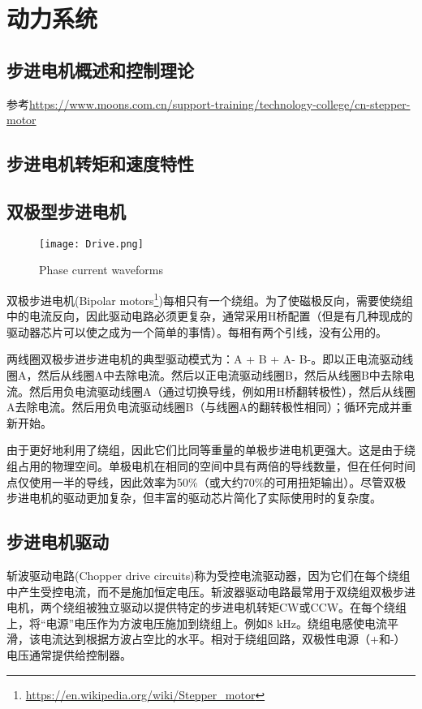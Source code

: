 \chapter{动力系统}
\label{cha:Motor}

\section{步进电机概述和控制理论}


参考\url{https://www.moons.com.cn/support-training/technology-college/cn-stepper-motor}

\section{步进电机转矩和速度特性}


\section{双极型步进电机}

\begin{figure}[htbp]
    \centering
    \texttt{[image: Drive.png]}
    \caption{Phase current waveforms}
    \label{fig:Phase-current}
\end{figure}

双极步进电机(Bipolar motors\footnote{\url{https://en.wikipedia.org/wiki/Stepper\_motor}})每相只有一个绕组。为了使磁极反向，需要使绕组中的电流反向，因此驱动电路必须更复杂，通常采用H桥配置（但是有几种现成的驱动器芯片可以使之成为一个简单的事情）。每相有两个引线，没有公用的。

两线圈双极步进步进电机的典型驱动模式为：A + B + A- B-。即以正电流驱动线圈A，然后从线圈A中去除电流。然后以正电流驱动线圈B，然后从线圈B中去除电流。然后用负电流驱动线圈A（通过切换导线，例如用H桥翻转极性），然后从线圈A去除电流。然后用负电流驱动线圈B（与线圈A的翻转极性相同）；循环完成并重新开始。

由于更好地利用了绕组，因此它们比同等重量的单极步进电机更强大。这是由于绕组占用的物理空间。单极电机在相同的空间中具有两倍的导线数量，但在任何时间点仅使用一半的导线，因此效率为50\%（或大约70\%的可用扭矩输出）。尽管双极步进电机的驱动更加复杂，但丰富的驱动芯片简化了实际使用时的复杂度。

\section{步进电机驱动}

斩波驱动电路(Chopper drive circuits)称为受控电流驱动器，因为它们在每个绕组中产生受控电流，而不是施加恒定电压。斩波器驱动电路最常用于双绕组双极步进电机，两个绕组被独立驱动以提供特定的步进电机转矩CW或CCW。在每个绕组上，将“电源”电压作为方波电压施加到绕组上。例如8 kHz。绕组电感使电流平滑，该电流达到根据方波占空比的水平。相对于绕组回路，双极性电源（+和-）电压通常提供给控制器。

